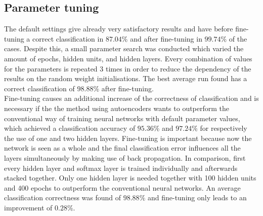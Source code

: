 \documentclass[a4paper,10pt]{article}
\begin{document}
\subsection{Parameter tuning}
The default settings give already very satisfactory results and have before fine-tuning a correct classification in $ 87.04\% $  and after fine-tuning in $ 99.74\% $ of the cases. Despite this, a small parameter search was conducted which varied the amount of epochs, hidden units, and hidden layers. Every combination of values for the parameters is repeated 3 times in order to reduce the dependency of the results on the random weight initialisations. The best average run found has a correct classification of $ 98.88\% $ after fine-tuning.\\

Fine-tuning causes an additional increase of the correctness of classification and is necessary if the the method using autoencoders wants to outperform the conventional way of training neural networks with default parameter values, which achieved a classification accuracy of $ 95.36\% $ and $ 97.24\%$ for respectively the use of one and two hidden layers. Fine-tuning is important because now the network is seen as a whole and the final classification error influences all the layers simultaneously by making use of back propagation. In comparison, first every hidden layer and softmax layer is trained individually and afterwards stacked together. Only one hidden layer is needed together with 100 hidden units and 400 epochs to outperform the conventional neural networks. An average classification correctness was found of $ 98.88\% $ and fine-tuning only leads to an improvement of $ 0.28\% $. 
\end{document}
